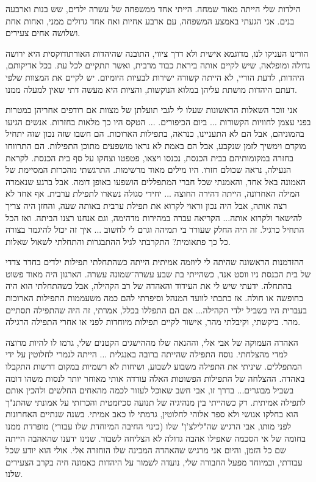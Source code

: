 \documentclass[14pt, article, extrafontsizes, twopage, a4paper]{memoir}
\begin{document}
הילדות שלי הייתה מאוד שמחה. הייתי אחד ממשפחה של עשרה ילדים, שש בנות וארבעה בנים. אני הגעתי באמצע המשפחה, עם ארבע אחיות ואח אחד גדולים ממני, ואחות אחת ושלושה אחים צעירים.

הורינו העניקו לנו, מדוגמא אישית ולא דרך ציווי, התובנה שהיהדות האורתודוקסית היא ירושה גדולה ומופלאה, שיש לקיים אותה ביראת כבוד מרבית, ואשר תתקיים לכל עת. בכל אדיקותם, היהדות, לדעת הוריי, לא הייתה קשורה ישירות לבעיות היומיום. יש לקיים את המצוות שלפי דעתם היהדות מושתת עליהן במלוא הנוקשות, והציות היא מעשה דתי שאין למעלה ממנו.

אני זוכר השאלות הראשונות שעלו לי לגבי תועלתן של מצוות אם רודפים אחריהן כמטרות בפני עצמן לחוויות הקשורות ... ביום הכיפורים. ... הטקס היו כך מלאות בחזרות. אנשים הגיעו בהמוניהם, אבל הם לא התעניינו, כנראה, בתפילות הארוכות. הם חשבו שזה נכון שזה יתחיל מוקדם וימשיך לזמן שנקבע, אבל הם באמת לא נראו מושפעים מתוכן התפילות. הם התרווחו בחזרה במקומותיהם בבית הכנסת, נכנסו ויצאו, פטפטו וצחקו על סף בית הכנסת. לקראת הנעילה, נראה שכולם חזרו. היו מילים מאוד מרשימות. התרגשתי מהכרזת המסיימת של האמונה באל אחד, והאמנתי שכל חברי המתפללים הושפעו באופן דומה.
אבל ברגע שנאמרה המילה האחרונה, הייתה דהירה החוצה ... יחידי סגולה נשארו לתפילת ערבית. אף אחד לא רצה אותה, אבל היה נכון וראוי לקרוא את תפילת ערבית באותה שעה, והחזן היה צריך להישאר ולקרוא אותה... הקריאה עברה במהירות מדהימה, וגם אנחנו רצנו הביתה. ואז הכל התחיל כרגיל. זה היה החלק שעורר בי תמיהה וגרם לי לחשוב ... איך זה יכול להיגמר בצורה כל כך פתאומית? התקרבתי לגיל ההתבגרות והתחלתי לשאול שאלות.

ההזדמנות הראשונה שהיתה לי ליוזמה אמיתית הייתה כשהתחלתי תפילות ילדים בחדר צדדי של בית הכנסת ניו ווסט אנד, כשהייתי בת שבע עשרה־שמונה עשרה. הארגון היה מאוד פשוט בהתחלה. ידעתי שיש לי את העידוד והאהדה של רב הקהילה, אבל כשהתחלתי הוא היה בחופשה או חולה. אז כתבתי לוועד המנהל וסיפרתי להם כמה משעממות התפילות הארוכות בעברית היו בשביל ילדי הקהילה... אם הם התפללו בכלל, אמרתי, זה היה שהתפילה תסתיים מהר. ביקשתי, וקיבלתי מהר, אישור לקיים תפילות מיוחדות לפני או אחרי התפילה הרגילה.

האהדה העמוקה של אבי אלי, וההנאה שלו מההישגים הקטנים שלי, גרמו לו להיות מרוצה למדי מהצלחתי. נוסח התפילה שהייתה ברובה באנגלית ... הייתה לגמרי לחלוטין על ידי המתפללים. שיניתי את התפילה משבוע לשבוע, ושיחות לא רשמיות במקום דרשות התקבלו באהדה. ההצלחה של התפילות הפשוטות האלה עודדה אותי מאוחר יותר לנסות משהו דומה בשביל מבוגרים... בדרך זו, אבי חשב שאוכל לעזור לכמה מהאחים החלשים ולהכין אותם לתפילה אמיתית. רק כשהייתי בין מנהיגיה של תנועה סכיזמטית והכרזתי על אמונתי שהתנ"ך הוא בחלקו אנושי ולא ספר אלוהי לחלוטין, גרמתי לו כאב אמיתי. בשנה שנתיים האחרונות לפני מותו, אבי הרגיש שה"לילצ'ן" שלו (כינוי החיבה המיוחדת שלו עבורי) מופרדת ממנו בחומה של אי הסכמה שאפילו אהבה גדולה לא הצליחה לשבור. שנינו ידענו שהאהבה הייתה שם כל הזמן, והיום אני מרגיש שהאהדה המבינה שלו הוחזרה אלי. אולי הוא יודע שכל עבודתי, ובמיוחד מפעל החבורה שלי, נועדה לשמור על היהדות כאמונה חיה בקרב הצעירים שלנו.
\end{document}
